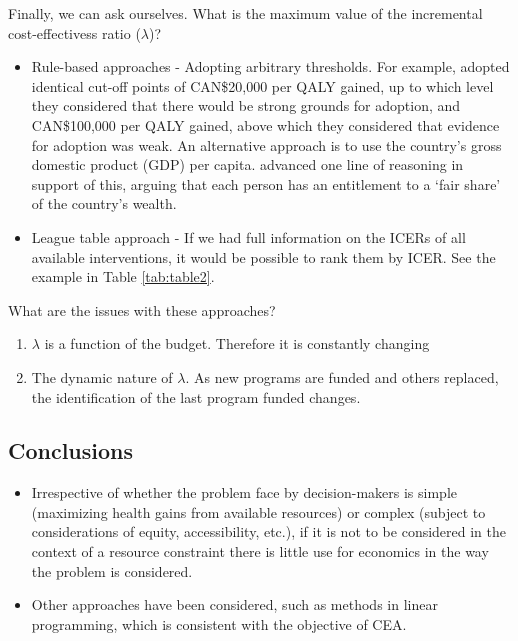 \documentclass[
]{book}
\providecommand{\tightlist}{%
  \setlength{\itemsep}{0pt}\setlength{\parskip}{0pt}}
\begin{document}
Finally, we can ask ourselves. What is the maximum value of the incremental cost-effectivess ratio (\(\lambda\))?

\begin{itemize}
\item
  Rule-based approaches - Adopting arbitrary thresholds. For example, \citet{laupacis1992attractive} adopted identical cut-off points of CAN\$20,000 per QALY gained, up to which level they considered that there would be strong grounds for adoption, and CAN\$100,000 per QALY gained, above which they considered that evidence for adoption was weak. An alternative approach is to use the country's gross domestic product (GDP) per capita. \citet{williams2004could} advanced one line of reasoning in support of this, arguing that each
  person has an entitlement to a `fair share' of the country's wealth.
\item
  League table approach - If we had full information on the ICERs of all available interventions, it would be possible to rank them by ICER. See the example in Table \ref{tab:table2}.
\end{itemize}

What are the issues with these approaches?

\begin{enumerate}
\def\labelenumi{\arabic{enumi}.}
\tightlist
\item
  \(\lambda\) is a function of the budget. Therefore it is constantly changing
\item
  The dynamic nature of \(\lambda\). As new programs are funded and others replaced, the identification of the last program funded changes.
\end{enumerate}

\hypertarget{conclusions}{%
\subsection{Conclusions}\label{conclusions}}

\begin{itemize}
\item
  Irrespective of whether the problem face by decision-makers is simple (maximizing health gains from available resources) or complex (subject to considerations of equity, accessibility, etc.), if it is not to be considered in the context of a resource constraint there is little use for economics in the way the problem is considered.
\item
  Other approaches have been considered, such as methods in linear programming, which is consistent with the objective of CEA.
\end{itemize}
\end{document}
